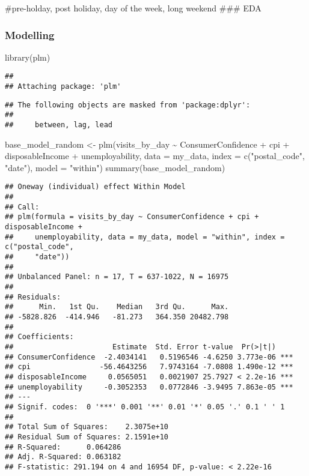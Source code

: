 \documentclass[
]{article}
\newenvironment{Shaded}{\begin{snugshade}}{\end{snugshade}}
\newcommand{\AttributeTok}[1]{\textcolor[rgb]{0.77,0.63,0.00}{#1}}
\newcommand{\FunctionTok}[1]{\textcolor[rgb]{0.00,0.00,0.00}{#1}}
\newcommand{\NormalTok}[1]{#1}
\newcommand{\OtherTok}[1]{\textcolor[rgb]{0.56,0.35,0.01}{#1}}
\newcommand{\SpecialCharTok}[1]{\textcolor[rgb]{0.00,0.00,0.00}{#1}}
\newcommand{\StringTok}[1]{\textcolor[rgb]{0.31,0.60,0.02}{#1}}
\begin{document}
\#pre-holday, post holiday, day of the week, long weekend \#\#\# EDA

\hypertarget{modelling}{%
\subsubsection{Modelling}\label{modelling}}

\begin{Shaded}
\begin{Highlighting}[]
\FunctionTok{library}\NormalTok{(plm)}
\end{Highlighting}
\end{Shaded}

\begin{verbatim}
## 
## Attaching package: 'plm'
\end{verbatim}

\begin{verbatim}
## The following objects are masked from 'package:dplyr':
## 
##     between, lag, lead
\end{verbatim}

\begin{Shaded}
\begin{Highlighting}[]
\NormalTok{base\_model\_random }\OtherTok{\textless{}{-}} \FunctionTok{plm}\NormalTok{(visits\_by\_day }\SpecialCharTok{\textasciitilde{}}\NormalTok{ ConsumerConfidence }\SpecialCharTok{+}\NormalTok{ cpi }\SpecialCharTok{+}\NormalTok{ disposableIncome }\SpecialCharTok{+}\NormalTok{ unemployability, }\AttributeTok{data =}\NormalTok{ my\_data, }\AttributeTok{index =} \FunctionTok{c}\NormalTok{(}\StringTok{"postal\_code"}\NormalTok{, }\StringTok{"date"}\NormalTok{), }\AttributeTok{model =} \StringTok{"within"}\NormalTok{)}
\FunctionTok{summary}\NormalTok{(base\_model\_random)}
\end{Highlighting}
\end{Shaded}

\begin{verbatim}
## Oneway (individual) effect Within Model
## 
## Call:
## plm(formula = visits_by_day ~ ConsumerConfidence + cpi + disposableIncome + 
##     unemployability, data = my_data, model = "within", index = c("postal_code", 
##     "date"))
## 
## Unbalanced Panel: n = 17, T = 637-1022, N = 16975
## 
## Residuals:
##      Min.   1st Qu.    Median   3rd Qu.      Max. 
## -5828.826  -414.946   -81.273   364.350 20482.798 
## 
## Coefficients:
##                       Estimate  Std. Error t-value  Pr(>|t|)    
## ConsumerConfidence  -2.4034141   0.5196546 -4.6250 3.773e-06 ***
## cpi                -56.4643256   7.9743164 -7.0808 1.490e-12 ***
## disposableIncome     0.0565051   0.0021907 25.7927 < 2.2e-16 ***
## unemployability     -0.3052353   0.0772846 -3.9495 7.863e-05 ***
## ---
## Signif. codes:  0 '***' 0.001 '**' 0.01 '*' 0.05 '.' 0.1 ' ' 1
## 
## Total Sum of Squares:    2.3075e+10
## Residual Sum of Squares: 2.1591e+10
## R-Squared:      0.064286
## Adj. R-Squared: 0.063182
## F-statistic: 291.194 on 4 and 16954 DF, p-value: < 2.22e-16
\end{verbatim}
\end{document}
